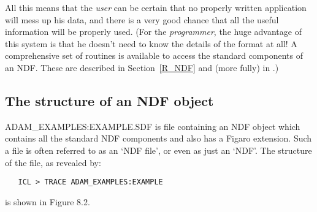 All this means that the {\em user} can be certain that no properly written
application will mess up his data, and there is a very good chance 
that all the useful information will be properly used.
(For the {\em programmer}, the huge advantage of this system is that he
doesn't need to know the details of the format at all!
A comprehensive set of routines is available to access the standard components
of an NDF.
These are described in Section~\ref{R_NDF} and (more fully) in
.)

\subsection{The structure of an NDF object}
\label{S_ndfstruc}

ADAM\_EXAMPLES:EXAMPLE.SDF is file containing an NDF object which contains all
the standard NDF components and also has a Figaro extension.
Such a file is often referred to as an `NDF file', or even as just an `NDF'.
The structure of the file, as revealed by:

\begin{small}
\begin{verbatim}
   ICL > TRACE ADAM_EXAMPLES:EXAMPLE
\end{verbatim}
\end{small}

is shown in Figure 8.2.


